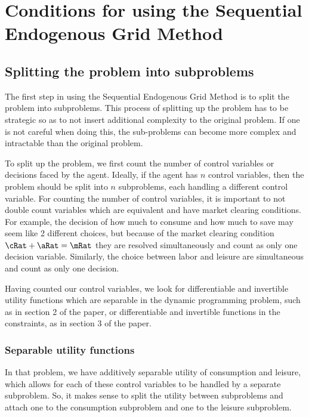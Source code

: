 \documentclass[\econtexRoot/SequentialEGM]{subfiles}
\begin{document}
\hypertarget{conditions}{}
\par\section{Conditions for using the Sequential Endogenous Grid Method}
\notinsubfile{\label{sec:conditions}}

\subsection{Splitting the problem into subproblems}

The first step in using the Sequential Endogenous Grid Method is to split the problem into subproblems. This process of splitting up the problem has to be strategic so as to not insert additional complexity to the original problem. If one is not careful when doing this, the sub-problems can become more complex and intractable than the original problem.

To split up the problem, we first count the number of control variables or decisions faced by the agent. Ideally, if the agent has $n$ control variables, then the problem should be split into $n$ subproblems, each handling a different control variable. For counting the number of control variables, it is important to not double count variables which are equivalent and have market clearing conditions. For example, the decision of how much to consume and how much to save may seem like 2 different choices, but because of the market clearing condition $\cRat + \aRat = \mRat$ they are resolved simultaneously and count as only one decision variable. Similarly, the
choice between labor and leisure are simultaneous and count as only one decision.

Having counted our control variables, we look for differentiable and invertible utility functions which are separable in the dynamic programming problem, such as in section 2 of the paper, or differentiable and invertible functions in the constraints, as in section 3 of the paper.

\subsubsection{Separable utility functions}

In that problem, we have additively separable utility of consumption and leisure, which allows for each of these control variables to be handled by a separate subproblem. So, it makes sense to split the utility between subproblems and attach one to the consumption subproblem and one to the leisure subproblem.
\end{document}
